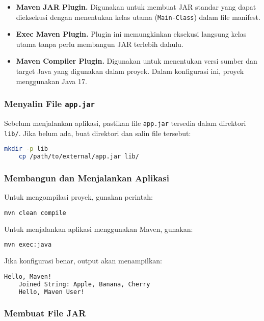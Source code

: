 \begin{itemize}
\begin{itemize}
		\item \textbf{Maven JAR Plugin.}  
		Digunakan untuk membuat JAR standar yang dapat dieksekusi dengan menentukan kelas utama (\texttt{Main-Class}) dalam file manifest.
		
		\item \textbf{Exec Maven Plugin.}  
		Plugin ini memungkinkan eksekusi langsung kelas utama tanpa perlu membangun JAR terlebih dahulu.
		
		\item \textbf{Maven Compiler Plugin.}  
		Digunakan untuk menentukan versi sumber dan target Java yang digunakan dalam proyek. Dalam konfigurasi ini, proyek menggunakan Java 17.
	\end{itemize}
\end{itemize}



\subsubsection{Menyalin File \texttt{app.jar}}

Sebelum menjalankan aplikasi, pastikan file \texttt{app.jar} tersedia dalam direktori \texttt{lib/}. Jika belum ada, buat direktori dan salin file tersebut:

\begin{lstlisting}[language=bash]
	mkdir -p lib
	cp /path/to/external/app.jar lib/
\end{lstlisting}

\subsubsection{Membangun dan Menjalankan Aplikasi}

Untuk mengompilasi proyek, gunakan perintah:
\begin{lstlisting}[language=bash]
	mvn clean compile
\end{lstlisting}

Untuk menjalankan aplikasi menggunakan Maven, gunakan:
\begin{lstlisting}[language=bash]
	mvn exec:java
\end{lstlisting}

Jika konfigurasi benar, output akan menampilkan:
\begin{lstlisting}[language=bash]
	Hello, Maven!
	Joined String: Apple, Banana, Cherry
	Hello, Maven User!
\end{lstlisting}

\subsubsection{Membuat File JAR}

